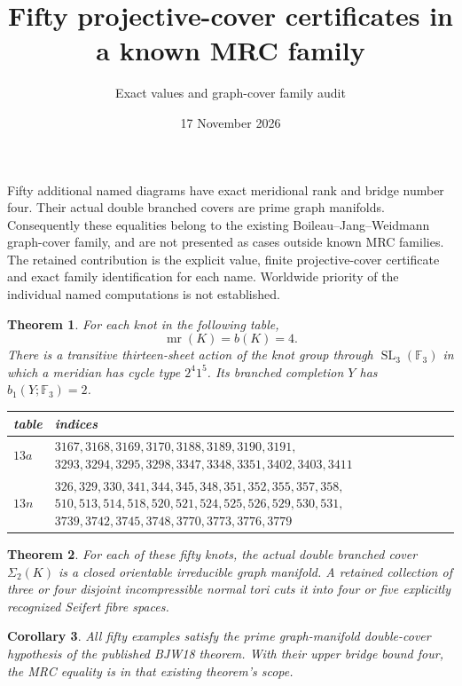 \documentclass[11pt]{article}
\title{Fifty projective-cover certificates in a known MRC family}
\author{Exact values and graph-cover family audit}
\date{17 November 2026}
\newtheorem{theorem}{Theorem}
\newtheorem{corollary}[theorem]{Corollary}
\newcommand{\mr}{\operatorname{mr}}
\newcommand{\F}{\mathbb F}
\begin{document}
\maketitle

Fifty additional named diagrams have exact meridional rank and bridge
number four. Their actual double branched covers are prime graph
manifolds. Consequently these equalities belong to the existing
Boileau--Jang--Weidmann graph-cover family, and are not presented as
cases outside known MRC families. The retained contribution is the
explicit value, finite projective-cover certificate and exact
family identification for each name. Worldwide priority of the
individual named computations is not established.

\begin{theorem}\label{thm:equalities}
For each knot in the following table,
\[
                         \mr(K)=b(K)=4.
\]
There is a transitive thirteen-sheet action of the knot group through
$\operatorname{SL}_3(\F_3)$ in which a meridian has cycle type
$2^4 1^5$. Its branched completion $Y$ has
$b_1(Y;\F_3)=2$.
\begin{center}\small
\begin{tabular}{lp{11.7cm}}
\toprule
table & indices\\
\midrule
$13a$ & $3167,3168,3169,3170,3188,3189,3190,3191,$\newline
$3293,3294,3295,3298,3347,3348,3351,3402,3403,3411$\\[3pt]
$13n$ & $326,329,330,341,344,345,348,351,352,355,357,358,$\newline
$510,513,514,518,520,521,524,525,526,529,530,531,$\newline
$3739,3742,3745,3748,3770,3773,3776,3779$\\
\bottomrule
\end{tabular}
\end{center}
\end{theorem}

\begin{theorem}\label{thm:graph}
For each of these fifty knots, the actual double branched cover
$\Sigma_2(K)$ is a closed orientable irreducible graph manifold.
A retained collection of three or four disjoint incompressible
normal tori cuts it into four or five explicitly recognized
Seifert fibre spaces.
\end{theorem}

\begin{corollary}\label{cor:known}
All fifty examples satisfy the prime graph-manifold double-cover
hypothesis of the published BJW18 theorem. With their upper bridge
bound four, the MRC equality is in that existing theorem's scope.
\end{corollary}
\end{document}
